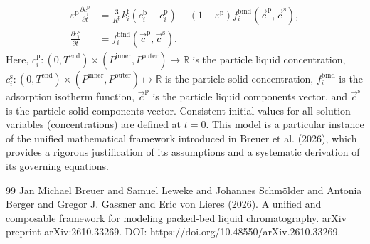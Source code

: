 \documentclass{article}
\begin{document}
\begin{align}
    \varepsilon^{\mathrm{p}}\frac{\partial c^{\mathrm{p}}_{i}}{\partial t}
    &= \frac{3}{R^{\mathrm{p}}} k^{\mathrm{f}}_{i} \left( c^{\mathrm{b}}_{i} - c^{\mathrm{p}}_{i} \right)
        - \left( 1 - \varepsilon^{\mathrm{p}} \right) f^{\mathrm{bind}}_{i}\left( \vec{c}^{\mathrm{p}}, \vec{c}^{\mathrm{s}} \right),
    \\
    \frac{\partial c^{\mathrm{s}}_{i}}{\partial t}
    &= f^{\mathrm{bind}}_{i}\left( \vec{c}^{\mathrm{p}}, \vec{c}^{\mathrm{s}} \right).
\end{align}
Here, $c^{\mathrm{p}}_{i}\colon (0, T^{\mathrm{end}}) \times (P^{\mathrm{inner}}, P^{\mathrm{outer}}) \mapsto \mathbb{R}$ is the particle liquid concentration, $c^{\mathrm{s}}_{i}\colon (0, T^{\mathrm{end}}) \times (P^{\mathrm{inner}}, P^{\mathrm{outer}}) \mapsto \mathbb{R}$ is the particle solid concentration, $f^{\mathrm{bind}}_{i}$ is the adsorption isotherm function, $\vec{c}^{\mathrm{p}}$ is the particle liquid components vector, and $\vec{c}^{\mathrm{s}}$ is the particle solid components vector.
Consistent initial values for all solution variables (concentrations) are defined at $t = 0$.
This model is a particular instance of the unified mathematical framework introduced in Breuer et al. (2026), which provides a rigorous justification of its assumptions and a systematic derivation of its governing equations.
\begin{thebibliography}{99}
     Jan Michael Breuer and Samuel Leweke and Johannes Schmölder and Antonia Berger and Gregor J. Gassner and Eric von Lieres (2026). A unified and composable framework for modeling packed-bed liquid chromatography. arXiv preprint arXiv:2610.33269. DOI: https://doi.org/10.48550/arXiv.2610.33269.
\end{thebibliography}
\end{document}
